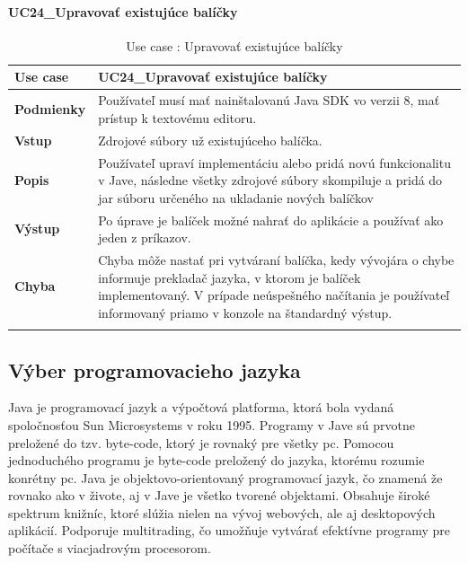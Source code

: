 \paragraph{UC24\_Upravovať existujúce balíčky}
\begin{center}
	\begin{longtable}{|p{2.5cm}|p{12.2cm}|}
		
			\hline
			\textbf{Use case} & UC24\_Upravovať existujúce balíčky \\ 
			\hline
			\textbf{Podmienky} &  Používateľ musí mať nainštalovanú Java SDK vo verzii 8, mať prístup k textovému editoru.  \\ 
			\hline
			\textbf{Vstup} & Zdrojové súbory už existujúceho balíčka.\\
			\hline
			\textbf{Popis} & Používateľ upraví implementáciu alebo pridá novú funkcionalitu v Jave, následne všetky zdrojové súbory skompiluje a pridá do \acrshort{jar} súboru určeného na ukladanie nových balíčkov\\ 
			\hline
			\textbf{Výstup} & Po úprave je balíček možné nahrať do aplikácie a používať ako jeden z príkazov.\\
			\hline
			\textbf{Chyba} & Chyba môže nastať pri vytváraní balíčka, kedy vývojára o chybe informuje prekladač jazyka, v ktorom je balíček implementovaný. V prípade neúspešného načítania je používateľ informovaný priamo v konzole na štandardný výstup.\\
			\hline
		\caption{Use case : Upravovať existujúce balíčky}
		\label{table:1}
		
	\end{longtable}
\end{center}
\subsection{Výber programovacieho jazyka}
\indent Java je programovací jazyk a výpočtová platforma, ktorá bola vydaná spoločnosťou Sun Microsystems v roku 1995. \cite{java} 
Programy v Jave sú prvotne preložené do tzv. byte-code, ktorý je rovnaký pre všetky \acrshort{pc}. Pomocou jednoduchého programu je byte-code preložený do jazyka, ktorému rozumie konrétny \acrshort{pc}.
Java je objektovo-orientovaný programovací jazyk, čo znamená že rovnako ako v živote, aj v Jave je všetko tvorené objektami. Obsahuje široké spektrum knižníc, ktoré slúžia nielen na vývoj webových, ale aj desktopových aplikácií.
Podporuje multitrading, čo umožňuje vytvárať efektívne programy pre počítače s viacjadrovým procesorom.\cite{javabook}
